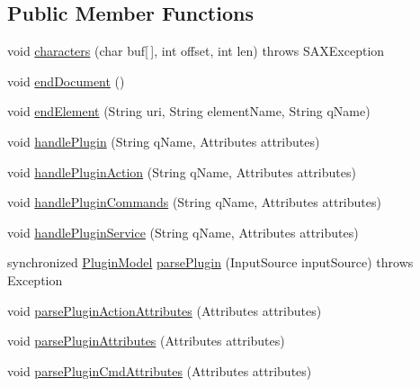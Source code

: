 \subsection*{Public Member Functions}
\begin{DoxyCompactItemize}
\item 
void \hyperlink{classorg_1_1tzi_1_1use_1_1runtime_1_1util_1_1_plugin_parser_ab4f0e5ade92d5c0b57bfab6da1075afb}{characters} (char buf\mbox{[}$\,$\mbox{]}, int offset, int len)  throws S\-A\-X\-Exception 
\item 
void \hyperlink{classorg_1_1tzi_1_1use_1_1runtime_1_1util_1_1_plugin_parser_a4e174a92ac2abe6512c53c4c5ae28dbd}{end\-Document} ()
\item 
void \hyperlink{classorg_1_1tzi_1_1use_1_1runtime_1_1util_1_1_plugin_parser_ad225babde7ffdd6b1f128abf6d4e401c}{end\-Element} (String uri, String element\-Name, String q\-Name)
\item 
void \hyperlink{classorg_1_1tzi_1_1use_1_1runtime_1_1util_1_1_plugin_parser_ac014d50aae19172656dfc429df9ec83f}{handle\-Plugin} (String q\-Name, Attributes attributes)
\item 
void \hyperlink{classorg_1_1tzi_1_1use_1_1runtime_1_1util_1_1_plugin_parser_aaca09c4e9c5dc3a1217f59352cf6ddc7}{handle\-Plugin\-Action} (String q\-Name, Attributes attributes)
\item 
void \hyperlink{classorg_1_1tzi_1_1use_1_1runtime_1_1util_1_1_plugin_parser_ae1c18f4cbdc087c94a325a610fbee40d}{handle\-Plugin\-Commands} (String q\-Name, Attributes attributes)
\item 
void \hyperlink{classorg_1_1tzi_1_1use_1_1runtime_1_1util_1_1_plugin_parser_a6c393c768c5b8a489d1c56c04f0d6db2}{handle\-Plugin\-Service} (String q\-Name, Attributes attributes)
\item 
synchronized \hyperlink{classorg_1_1tzi_1_1use_1_1runtime_1_1model_1_1_plugin_model}{Plugin\-Model} \hyperlink{classorg_1_1tzi_1_1use_1_1runtime_1_1util_1_1_plugin_parser_a97afa286a1addaaf75259a850bb6ac7d}{parse\-Plugin} (Input\-Source input\-Source)  throws Exception 
\item 
void \hyperlink{classorg_1_1tzi_1_1use_1_1runtime_1_1util_1_1_plugin_parser_ace039deea81f22ef6d5cf41f474ccfac}{parse\-Plugin\-Action\-Attributes} (Attributes attributes)
\item 
void \hyperlink{classorg_1_1tzi_1_1use_1_1runtime_1_1util_1_1_plugin_parser_a0e38e40294b55485f1cc5e454f3ec61a}{parse\-Plugin\-Attributes} (Attributes attributes)
\item 
void \hyperlink{classorg_1_1tzi_1_1use_1_1runtime_1_1util_1_1_plugin_parser_a0ec34b4e21502db0358b880537d8ffa8}{parse\-Plugin\-Cmd\-Attributes} (Attributes attributes)

\end{DoxyCompactItemize}
